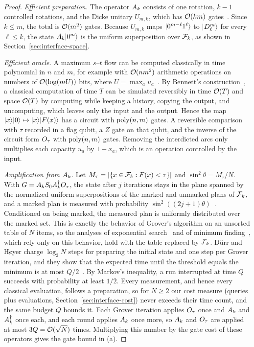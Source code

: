 \begin{proof}
\emph{Efficient preparation.} The operator $A_k$ consists of one rotation, $k-1$ controlled rotations, and the Dicke unitary $U_{m,k}$, which has $\mathcal{O}(km)$ gates~\cite{bartschi2019}. Since $k\le m$, the total is $\mathcal{O}(m^2)$ gates. Because $U_{m,k}$ maps $\lvert 0^{m-\ell}1^\ell \rangle$ to $\lvert D^m_\ell \rangle$ for every $\ell\le k$, the state $A_k\lvert 0^m \rangle$ is the uniform superposition over $\mathcal{F}_k$, as shown in Section~\ref{sec:interface-space}.

\emph{Efficient oracle.} A maximum $s$--$t$ flow can be computed classically in time polynomial in $n$ and $m$, for example with $\mathcal{O}(nm^2)$ arithmetic operations on numbers of $\mathcal{O}(\log(mU))$ bits, where $U=\max_a u_a$~\cite{ahuja1993}. By Bennett's construction~\cite{bennett1973}, a classical computation of time $T$ can be simulated reversibly in time $\mathcal{O}(T)$ and space $\mathcal{O}(T)$ by computing while keeping a history, copying the output, and uncomputing, which leaves only the input and the output. Hence the map $\lvert x \rangle\lvert 0 \rangle\mapsto\lvert x \rangle\lvert F(x) \rangle$ has a circuit with $\operatorname{poly}(n,m)$ gates. A reversible comparison with $\tau$ recorded in a flag qubit, a $Z$ gate on that qubit, and the inverse of the circuit form $O_\tau$ with $\operatorname{poly}(n,m)$ gates. Removing the interdicted arcs only multiplies each capacity $u_a$ by $1-x_a$, which is an operation controlled by the input.

\emph{Amplification from $A_k$.} Let $M_\tau=|\{x\in\mathcal{F}_k : F(x)<\tau\}|$ and $\sin^2\theta=M_\tau/N$. With $G=A_k S_0A_k^{\dagger}O_\tau$, the state after $j$ iterations stays in the plane spanned by the normalized uniform superpositions of the marked and unmarked plans of $\mathcal{F}_k$, and a marked plan is measured with probability $\sin^2((2j+1)\theta)$~\cite{bhmt2002}. Conditioned on being marked, the measured plan is uniformly distributed over the marked set. This is exactly the behavior of Grover's algorithm on an unsorted table of $N$ items, so the analyses of exponential search~\cite{bbht1998} and of minimum finding~\cite{durr1996}, which rely only on this behavior, hold with the table replaced by $\mathcal{F}_k$. Dürr and Høyer charge $\log_2 N$ steps for preparing the initial state and one step per Grover iteration, and they show that the expected time until the threshold equals the minimum is at most $Q/2$~\cite{durr1996}. By Markov's inequality, a run interrupted at time $Q$ succeeds with probability at least $1/2$. Every measurement, and hence every classical evaluation, follows a preparation, so for $N\ge 2$ our cost measure (queries plus evaluations, Section~\ref{sec:interface-cost}) never exceeds their time count, and the same budget $Q$ bounds it. Each Grover iteration applies $O_\tau$ once and $A_k$ and $A_k^{\dagger}$ once each, and each round applies $A_k$ once more, so $A_k$ and $O_\tau$ are applied at most $3Q=\mathcal{O}(\sqrt{N})$ times. Multiplying this number by the gate cost of these operators gives the gate bound in (a).


\end{proof}
